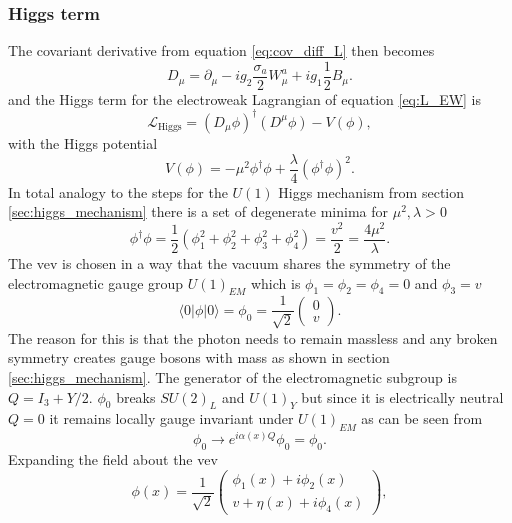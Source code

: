 \subsubsection*{Higgs term}
The covariant derivative from equation \ref{eq:cov_diff_L} then becomes
\begin{equation}
    D_\mu=\partial_\mu- i g_2\frac{{\sigma}_a}{2}W_\mu^a+ ig_1\frac{1}{2}B_\mu.
\end{equation}
and the Higgs term for the electroweak Lagrangian of equation \ref{eq:L_EW} is
\begin{equation}
    \mathcal{L}_\text{Higgs}= \left(D_\mu\phi\right)^\dagger (D^\mu\phi)-V(\phi),
    \label{eq:L_higgs}
\end{equation}
with the Higgs potential
\begin{equation}
    V(\phi) = -\mu^2\phi^\dagger\phi+\frac{\lambda}{4}\left(\phi^\dagger\phi\right)^2.
    \label{eq:Higgs_initial_potential}
\end{equation}
In total analogy to the steps for the $U(1)$ Higgs mechanism from section \ref{sec:higgs_mechanism} there is a set of degenerate minima for $\mu^2,\lambda>0$
\begin{equation}
    \phi^\dagger\phi=\frac{1}{2}(\phi_1^2+\phi_2^2+\phi_3^2+\phi_4^2)=\frac{v^2}{2}=\frac{4\mu^2}{\lambda}.
    \label{eq:higgs_vev}
\end{equation}
The \ac{vev} is chosen in a way that the vacuum shares the symmetry of the electromagnetic gauge group $U(1)_{EM}$ which is \mbox{$\phi_1=\phi_2=\phi_4=0$} and $\phi_3=v$
\begin{equation}
    \langle0\vert \phi \vert0\rangle=\phi_0=\frac{1}{\sqrt{2}}
    \begin{pmatrix}
        0 \\
        v
    \end{pmatrix}.
\end{equation}
The reason for this is that the photon needs to remain massless and any broken symmetry creates gauge bosons with mass as shown in section \ref{sec:higgs_mechanism}. The generator of the electromagnetic subgroup is $Q=I_3+Y/2$. $\phi_0$ breaks $SU(2)_L$ and $U(1)_Y$ but since it is electrically neutral $Q=0$ it remains locally gauge invariant under $U(1)_{EM}$ as can be seen from
\begin{equation}
    \phi_0 \rightarrow e^{i\alpha(x)Q}\phi_0=\phi_0.
\end{equation}
Expanding the field about the \ac{vev}
\begin{equation}
    \phi(x)=\frac{1}{\sqrt{2}}
    \begin{pmatrix}
        \phi_1 (x)+i \phi_2 (x) \\
        v+ \eta(x)+i \phi_4 (x)
    \end{pmatrix},
\end{equation}
